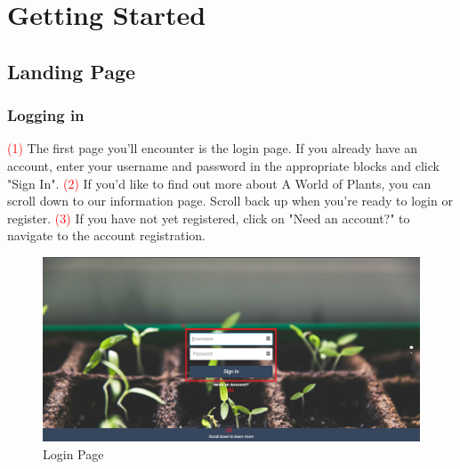 \documentclass{article}
\begin{document}
\cleardoublepage

\section{Getting Started}
	\subsection{Landing Page}
	\subsubsection{Logging in}
		\textcolor{red}{(1)} The first page you'll encounter is the login page. If you already have an account, enter your username and password in the appropriate blocks and click "Sign In".
		\newline
		\textcolor{red}{(2)} If you'd like to find out more about A World of Plants, you can scroll down to our information page. Scroll back up when you're ready to login or register.
		\newline
		\textcolor{red}{(3)} If you have not yet registered, click on "Need an account?" to navigate to the account registration.
		\begin{figure}[H]
			\includegraphics[width=\textwidth]{../images/UserManual/login.PNG}
			\caption{Login Page}
		\end{figure}				
		
\end{document}
